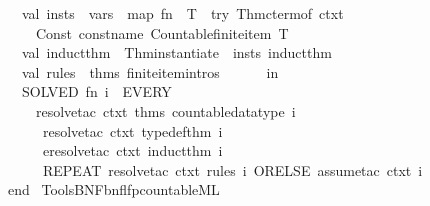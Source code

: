 \begin{isabellebody}
\ \ \ \ \ \ \ \ val\ insts\ {\isacharequal}\ vars\ {\isacharbar}{\isachargreater}\ map\ {\isacharparenleft}fn\ {\isacharparenleft}{\isacharunderscore}{\isacharcomma}\ T{\isacharparenright}\ {\isacharequal}{\isachargreater}\ try\ {\isacharparenleft}Thm{\isachardot}cterm{\isacharunderscore}of\ ctxt{\isacharparenright}\isanewline
\ \ \ \ \ \ \ \ \ \ {\isacharparenleft}Const\ {\isacharparenleft}{\isacharat}{\isacharbraceleft}const{\isacharunderscore}name\ Countable{\isachardot}finite{\isacharunderscore}item{\isacharbraceright}{\isacharcomma}\ T{\isacharparenright}{\isacharparenright}{\isacharparenright}\isanewline
\ \ \ \ \ \ \ \ val\ induct{\isacharunderscore}thm{\isacharprime}\ {\isacharequal}\ Thm{\isachardot}instantiate{\isacharprime}\ {\isacharbrackleft}{\isacharbrackright}\ insts\ induct{\isacharunderscore}thm\isanewline
\ \ \ \ \ \ \ \ val\ rules\ {\isacharequal}\ {\isacharat}{\isacharbraceleft}thms\ finite{\isacharunderscore}item{\isachardot}intros{\isacharbraceright}\isanewline
\ \ \ \ \ \ in\isanewline
\ \ \ \ \ \ \ \ SOLVED{\isacharprime}\ {\isacharparenleft}fn\ i\ {\isacharequal}{\isachargreater}\ EVERY\isanewline
\ \ \ \ \ \ \ \ \ \ {\isacharbrackleft}resolve{\isacharunderscore}tac\ ctxt\ {\isacharat}{\isacharbraceleft}thms\ countable{\isacharunderscore}datatype{\isacharbraceright}\ i{\isacharcomma}\isanewline
\ \ \ \ \ \ \ \ \ \ \ resolve{\isacharunderscore}tac\ ctxt\ {\isacharbrackleft}typedef{\isacharunderscore}thm{\isacharbrackright}\ i{\isacharcomma}\isanewline
\ \ \ \ \ \ \ \ \ \ \ eresolve{\isacharunderscore}tac\ ctxt\ {\isacharbrackleft}induct{\isacharunderscore}thm{\isacharprime}{\isacharbrackright}\ i{\isacharcomma}\isanewline
\ \ \ \ \ \ \ \ \ \ \ REPEAT\ {\isacharparenleft}resolve{\isacharunderscore}tac\ ctxt\ rules\ i\ ORELSE\ assume{\isacharunderscore}tac\ ctxt\ i{\isacharparenright}{\isacharbrackright}{\isacharparenright}\ {}\isanewline
\ \ \ \ \ \ end{\isacharparenright}\isanewline
{\isacartoucheclose}%
\endisatagML
{\isafoldML}%
%
\isadelimML
\isanewline
%
\endisadelimML
\isanewline
{}\isamarkupfalse%
%
\isadelimdocument
%
\endisadelimdocument
%
\isatagdocument
%
\isamarkuptrue%
%
\endisatagdocument
{\isafolddocument}%
%
\isadelimdocument
%
\endisadelimdocument
%
\isadelimML
%
\endisadelimML
%
\isatagML
{}\isamarkupfalse%
\ {\isachardoublequoteopen}{\isachardot}{\isachardot}{\isacharslash}Tools{\isacharslash}BNF{\isacharslash}bnf{\isacharunderscore}lfp{\isacharunderscore}countable{\isachardot}ML{\isachardoublequoteclose}\isanewline

\end{isabellebody}
